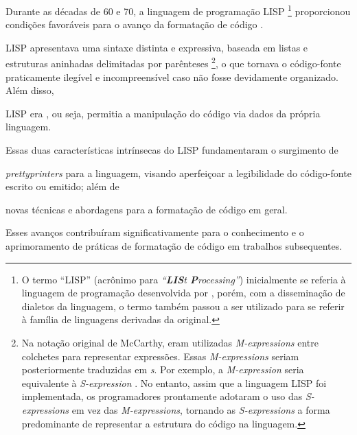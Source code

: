 \documentclass
  [11pt, a4paper, english, openright, sumario = tradicional, twoside, brazil]
  {abntex2}
\begin{document}
  Durante as décadas de 60 e 70, a linguagem de programação LISP%
  \footnote
    {O termo ``LISP'' (acrônimo para
     \textit{``\textbf{LIS}t \textbf{P}rocessing''})
     inicialmente se referia à linguagem de programação desenvolvida por
     \textcite{mccarthy-1960-recursive}, porém, com a disseminação de dialetos
     da linguagem, o termo também passou a ser utilizado para se referir à
     família de linguagens derivadas da original.}
  proporcionou condições favoráveis para o avanço da formatação de código
  \cite[2]{yelland-2015-new}.
  \begin{inparaenum}
    \item LISP apresentava uma sintaxe distinta e expressiva, baseada em listas
          e estruturas aninhadas delimitadas por parênteses%
          \footnote
            {Na notação original de McCarthy, eram utilizadas
             \textit{M-expressions} entre colchetes para representar
             expressões. Essas \textit{M-expressions} seriam posteriormente
             traduzidas em \textit{s}. Por exemplo, a
             \textit{M-expression}  seria
             equivalente à \textit{S-expression}
             .
             No entanto, assim que a linguagem LISP foi implementada, os
             programadores prontamente adotaram o uso das
             \textit{S-expressions} em vez das \textit{M-expressions}, tornando
             as \textit{S-expressions} a forma predominante de representar a
             estrutura do código na linguagem.},
          o que tornava o código-fonte praticamente ilegível e incompreensível
          caso não fosse devidamente organizado. Além disso,
    \item LISP era , ou seja, permitia a manipulação do
          código via dados da própria linguagem.
  \end{inparaenum}
  Essas duas características intrínsecas do LISP fundamentaram o surgimento de
  \begin{inparaenum}
    \item \textit{prettyprinters} para a linguagem, visando aperfeiçoar a
          legibilidade do código-fonte escrito ou emitido; além de
    \item novas técnicas e abordagens para a formatação de código em geral.
  \end{inparaenum}
  Esses avanços contribuíram significativamente para o conhecimento e o
  aprimoramento de práticas de formatação de código em trabalhos subsequentes.
\end{document}
